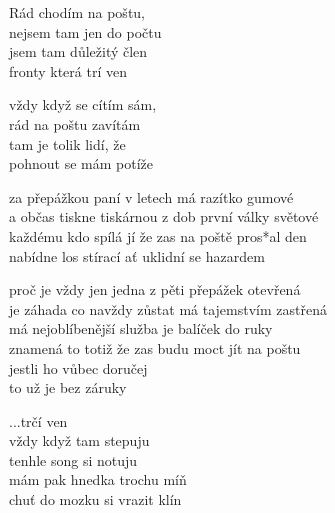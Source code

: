 

\cho{}
Rád chodím na poštu,\\
nejsem tam jen do počtu\\
jsem tam důležitý člen\\
fronty která trí ven

vždy když se cítím sám,\\
rád na poštu zavítám\\
tam je tolik lidí, že\\
pohnout se mám potíže

\ve{}
za přepážkou paní v letech má razítko gumové\\
a občas tiskne tiskárnou z dob první války světové\\
každému kdo spílá jí že zas na poště pros*al den\\
nabídne los stírací ať uklidní se hazardem

\cho{}

\ve{}
proč je vždy jen jedna z pěti přepážek otevřená\\
je záhada co navždy zůstat má tajemstvím zastřená\\
má nejoblíbenější služba je balíček do ruky\\
znamená to totiž že zas budu moct jít na poštu\\
jestli ho vůbec doručej\\
to už je bez záruky

\cho{}
...trčí ven\\
vždy když tam stepuju\\
tenhle song si notuju\\
mám pak hnedka trochu míň\\
chuť do mozku si vrazit klín

\esong{}